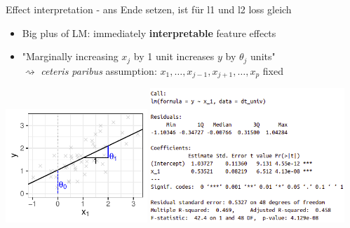 \documentclass[11pt,compress,t,notes=noshow, xcolor=table]{beamer}
\begin{document}
\begin{vbframe}{Effect interpretation - ans Ende setzen, ist für l1 und l2 loss gleich}

\begin{itemize}
    \item Big plus of LM: immediately \textbf{interpretable} feature effects
    \item "Marginally increasing $x_j$ by 1 unit increases $y$ by $\theta_j$ 
    units" \\
    $\rightsquigarrow$ \textit{ceteris paribus} assumption: 
    $x_1, \dots, x_{j - 1}, x_{j + 1}, \dots, x_p$ fixed
\end{itemize}

\vfill
\includegraphics[width=0.4\textwidth]{figure/reg_l2_basic_lm_interpreted.pdf} 
\hfill
\includegraphics[width=0.55\textwidth]{figure_man/lm_summary} 

\end{vbframe}


\end{document}
